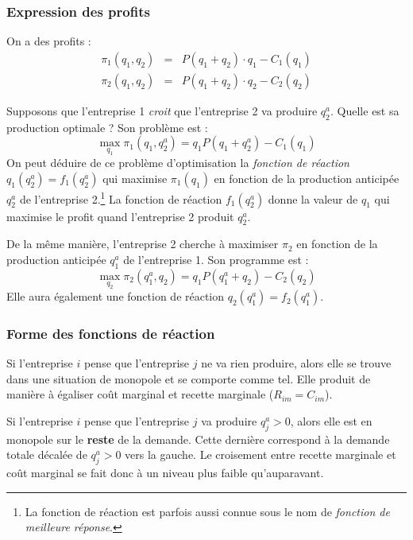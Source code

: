\documentclass[
]{book}
\theoremstyle{definition}
\theoremstyle{definition}
\theoremstyle{definition}
\theoremstyle{definition}
\theoremstyle{remark}
\begin{document}
\hypertarget{expression-des-profits}{%
\subsubsection{Expression des profits}\label{expression-des-profits}}

On a des profits :
\[
\begin{array}{rcl}
\pi_1(q_1, q_2) &=& P(q_1+q_2)\cdot q_1-C_1(q_1)\\
\pi_2(q_1, q_2) &=& P(q_1+q_2)\cdot q_2-C_2(q_2)
\end{array}
\label{eq:profitcournot}
\]

Supposons que l'entreprise 1 \emph{croit} que l'entreprise 2 va produire \(q_2^a\).
Quelle est sa production optimale ?
Son problème est :
\[
\max_{q_1} \pi_1(q_1, q_2^a) =  q_1P(q_1+q_2^a)-C_1(q_1)
\]
On peut déduire de ce problème d'optimisation la \emph{fonction de réaction} \(q_1(q_2^a)=f_1(q_2^a)\) qui maximise \(\pi_1(q_1)\) en fonction de la production anticipée \(q_2^a\) de l'entreprise 2.\footnote{La fonction de réaction est parfois aussi connue sous le nom de \emph{fonction de meilleure réponse}.}
La fonction de réaction \(f_1(q_2^a)\) donne la valeur de \(q_1\) qui maximise le profit quand l'entreprise 2 produit \(q_2^a\).

De la même manière, l'entreprise 2 cherche à maximiser \(\pi_2\) en fonction de la production anticipée \(q_1^a\) de l'entreprise 1.
Son programme est :
\[
\max_{q_2} \pi_2(q_1^a, q_2) =  q_1P(q_1^a+q_2)-C_2(q_2)
\]
Elle aura également une fonction de réaction \(q_2(q_1^a)=f_2(q_1^a)\).

\hypertarget{forme-des-fonctions-de-ruxe9action}{%
\subsubsection{Forme des fonctions de réaction}\label{forme-des-fonctions-de-ruxe9action}}

Si l'entreprise \(i\) pense que l'entreprise \(j\) ne va rien produire, alors elle se trouve dans une situation de monopole et se comporte comme tel.
Elle produit de manière à égaliser coût marginal et recette marginale (\(R_{im}=C_{im}\)).

Si l'entreprise \(i\) pense que l'entreprise \(j\) va produire \(q_j^a>0\), alors elle est en monopole sur le \textbf{reste} de la demande.
Cette dernière correspond à la demande totale décalée de \(q_j^a>0\) vers la gauche.
Le croisement entre recette marginale et coût marginal se fait donc à un niveau plus faible qu'auparavant.
\end{document}
